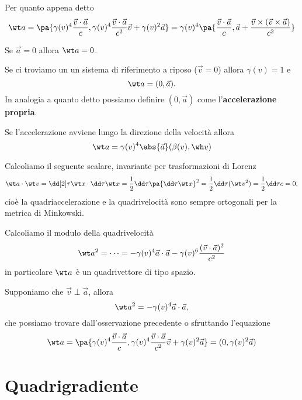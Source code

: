 \begin{remark}
Per quanto appena detto
\[\wt a=\pa{\gamma(v)^4\frac{\vec v\cdot \vec a}{c},\gamma(v)^4\frac{\vec v\cdot \vec a}{c^2}\vec v+\gamma(v)^2\vec a}=\gamma(v)^4\pa{\frac{\vec v\cdot \vec a}{c},\vec a+\frac{\vec v\times(\vec v\times \vec a)}{c^2}}\]
\end{remark}

\begin{remark}
Se $\vec a=0$ allora $\wt a=0$.
\end{remark}

\begin{remark}
Se ci troviamo un un sistema di riferimento a riposo ($\vec v=0$) allora $\gamma(v)=1$ e
\[\wt a=(0,\vec a).\]
In analogia a quanto detto possiamo definire $(0,\vec a)$ come l'\textbf{accelerazione propria}.
\end{remark}

\begin{remark}
Se l'accelerazione avviene lungo la direzione della velocit\`a allora
\[\wt a=\gamma(v)^4\abs{\vec a}(\beta(v),\wh v)\]
\end{remark}

\begin{remark}
Calcoliamo il seguente scalare, invariante per trasformazioni di Lorenz
\[\wt a\cdot \wt v=\dd[2]\tau{\wt x}\cdot \dd \tau{\wt x}=\frac12\dd\tau{}\pa{\dd \tau{\wt x}}^2=\frac 12\dd\tau{}(\wt v^2)=\frac 12\dd\tau c=0,\]
cio\`e la quadriaccelerazione e la quadrivelocit\`a sono sempre ortogonali per la metrica di Minkowski.
\end{remark}

\begin{remark}
Calcoliamo il modulo della quadrivelocit\`a
\[\wt a^2=\cdots=-\gamma(v)^4\vec a\cdot\vec a-\gamma(v)^6\frac{(\vec v\cdot \vec a)^2}{c^2}\]
in particolare $\wt a$ \`e un quadrivettore di tipo spazio.
\end{remark}

\begin{remark}
Supponiamo che $\vec v\perp \vec a$, allora
\[\wt a^2=-\gamma(v)^4\vec a\cdot \vec a,\]
che possiamo trovare dall'osservazione precedente o sfruttando l'equazione \[\wt a=\pa{\gamma(v)^4\frac{\vec v\cdot \vec a}{c},\gamma(v)^4\frac{\vec v\cdot \vec a}{c^2}\vec v+\gamma(v)^2\vec a}=(0,\gamma(v)^2\vec a)\]
\end{remark}


\section{Quadrigradiente}

